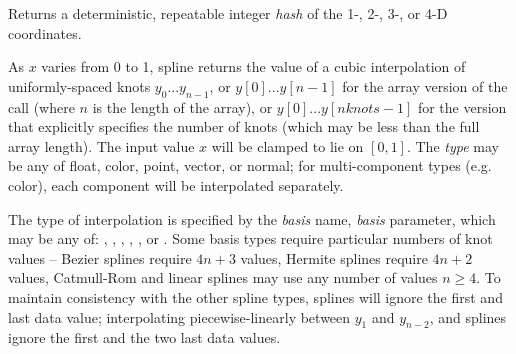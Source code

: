 \documentclass[11pt,letterpaper]{book}
\def\color{{\cf color}\xspace}
\def\float{{\cf float}\xspace}
\def\normal{{\cf normal}\xspace}
\def\point{{\cf point}\xspace}
\def\vector{{\cf vector}\xspace}
\begin{document}
\NEW %
Returns a deterministic, repeatable integer \emph{hash} of the 1-, 2-, 3-,
or 4-D coordinates.
\apiend


As $x$ varies from 0 to 1, {\cf spline} returns the value of a cubic
interpolation of uniformly-spaced knots $y_0$...$y_{n-1}$, or
$y[0]$...$y[n-1]$ for the array version of the call (where $n$ is the
length of the array), or $y[0]$...$y[nknots-1]$ for the version that
explicitly specifies the number of knots (which may be less than the
full array length).  The input value $x$ will be clamped to lie
on $[0,1]$.  The \emph{type} may be any of \float, \color,
\point, \vector, or \normal; for multi-component types (e.g. \color),
each component will be interpolated separately.

The type of interpolation is specified by the \emph{basis} name,
\emph{basis} parameter, which may be any of: ,
, , , , or 
. Some basis
types require particular numbers of knot values -- Bezier splines
require $4n+3$ values, Hermite splines require $4n+2$ values,
Catmull-Rom and linear splines may use any number of values $n\ge 4$.
To maintain consistency with the other spline types,  splines will
ignore the first and last data value; interpolating piecewise-linearly
between $y_1$ and $y_{n-2}$, and  splines ignore the first
and the two last data values.
\apiend

\end{document}
